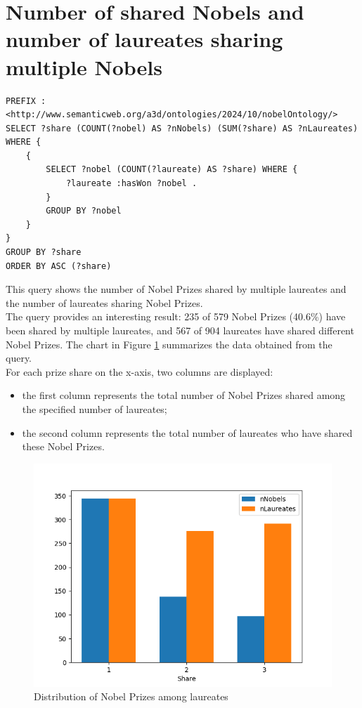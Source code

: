 \documentclass{article}
\begin{document}
\newpage

\section{Number of shared Nobels and number of laureates sharing multiple Nobels}

\begin{lstlisting}
PREFIX : <http://www.semanticweb.org/a3d/ontologies/2024/10/nobelOntology/>
SELECT ?share (COUNT(?nobel) AS ?nNobels) (SUM(?share) AS ?nLaureates) WHERE {
    {
        SELECT ?nobel (COUNT(?laureate) AS ?share) WHERE {
            ?laureate :hasWon ?nobel .
        }
        GROUP BY ?nobel
    }
}
GROUP BY ?share
ORDER BY ASC (?share)
\end{lstlisting}

\vspace{1em}

This query shows the number of Nobel Prizes shared by multiple laureates
and the number of laureates sharing Nobel Prizes.\\
The query provides an interesting result: 235 of 579 Nobel Prizes (40.6\%) have
been shared by multiple laureates, and 567 of 904 laureates have shared different Nobel Prizes.
The chart in Figure \ref{fig:prizeShare} summarizes the data obtained from the query.\\
For each prize share on the x-axis, two columns are displayed:
\begin{itemize}
	\item the first column represents the total number of Nobel Prizes shared among the specified number of laureates;
	\item the second column represents the total number of laureates who have shared these Nobel Prizes.
\end{itemize}

\begin{figure}[H]
	\centering
	\includegraphics[width=0.7\linewidth]{../queries/plots/nobelShare.png}
	\caption{Distribution of Nobel Prizes among laureates}
	\label{fig:prizeShare}
\end{figure}
\end{document}
